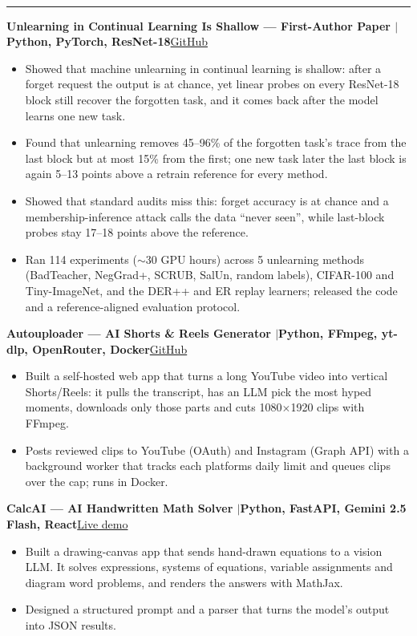 \documentclass[10pt,a4paper]{article}
\renewcommand{\section}[1]{\vspace{6pt}{\large\bfseries\MakeUppercase{#1}}\\[-7pt]\rule{\textwidth}{0.6pt}\vspace{2pt}}
\newcommand{\entry}[2]{\par\textbf{#1}\hfill #2\par}
\newenvironment{points}{\vspace{-4pt}\begin{itemize}\setlength{\itemsep}{0pt}\setlength{\parskip}{0pt}\setlength{\topsep}{0pt}\setlength{\partopsep}{0pt}\setlength{\leftmargin}{12pt}}{\end{itemize}\vspace{-2pt}}
\newcommand{\sep}{\enspace$|$\enspace}
\begin{document}
\section{AI / ML Projects}
\entry{Unlearning in Continual Learning Is Shallow --- First-Author Paper \textnormal{\sep Python, PyTorch, ResNet-18}}{\href{https://github.com/Adarshmilan/CUL-continual-unlearning-}{GitHub}}
\begin{points}
  \item Showed that machine unlearning in continual learning is shallow: after a forget request the output is at chance, yet linear probes on every ResNet-18 block still recover the forgotten task, and it comes back after the model learns one new task.
  \item Found that unlearning removes 45--96\% of the forgotten task's trace from the last block but at most 15\% from the first; one new task later the last block is again 5--13 points above a retrain reference for every method.
  \item Showed that standard audits miss this: forget accuracy is at chance and a membership-inference attack calls the data ``never seen'', while last-block probes stay 17--18 points above the reference.
  \item Ran 114 experiments ($\sim$30 GPU hours) across 5 unlearning methods (BadTeacher, NegGrad+, SCRUB, SalUn, random labels), CIFAR-100 and Tiny-ImageNet, and the DER++ and ER replay learners; released the code and a reference-aligned evaluation protocol.
\end{points}
\entry{Autouploader --- AI Shorts \& Reels Generator \textnormal{\sep Python, FFmpeg, yt-dlp, OpenRouter, Docker}}{\href{https://github.com/Adarshmilan/autouploader}{GitHub}}
\begin{points}
  \item Built a self-hosted web app that turns a long YouTube video into vertical Shorts/Reels: it pulls the transcript, has an LLM pick the most hyped moments, downloads only those parts and cuts 1080$\times$1920 clips with FFmpeg.
  \item Posts reviewed clips to YouTube (OAuth) and Instagram (Graph API) with a background worker that tracks each platforms daily limit and queues clips over the cap; runs in Docker.
\end{points}
\entry{CalcAI --- AI Handwritten Math Solver \textnormal{\sep Python, FastAPI, Gemini 2.5 Flash, React}}{\href{https://calcai-50046872763.development.catalystappsail.in}{Live demo}}
\begin{points}
  \item Built a drawing-canvas app that sends hand-drawn equations to a vision LLM. It solves expressions, systems of equations, variable assignments and diagram word problems, and renders the answers with MathJax.
  \item Designed a structured prompt and a parser that turns the model's output into JSON results.
\end{points}
\end{document}
